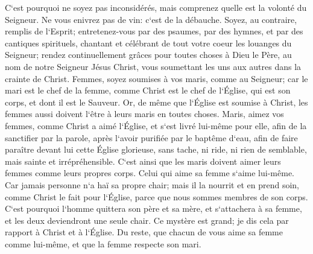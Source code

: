 \verse C`est pourquoi ne soyez pas inconsidérés, mais comprenez quelle est la volonté du Seigneur. 
\verse Ne vous enivrez pas de vin: c`est de la débauche. Soyez, au contraire, remplis de l`Esprit; 
\verse entretenez-vous par des psaumes, par des hymnes, et par des cantiques spirituels, chantant et célébrant de tout votre coeur les louanges du Seigneur; 
\verse rendez continuellement grâces pour toutes choses à Dieu le Père, au nom de notre Seigneur Jésus Christ, 
\verse vous soumettant les uns aux autres dans la crainte de Christ. 
\verse Femmes, soyez soumises à vos maris, comme au Seigneur; 
\verse car le mari est le chef de la femme, comme Christ est le chef de l`Église, qui est son corps, et dont il est le Sauveur. 
\verse Or, de même que l`Église est soumise à Christ, les femmes aussi doivent l`être à leurs maris en toutes choses. 
\verse Maris, aimez vos femmes, comme Christ a aimé l`Église, et s`est livré lui-même pour elle, 
\verse afin de la sanctifier par la parole, après l`avoir purifiée par le baptême d`eau, 
\verse afin de faire paraître devant lui cette Église glorieuse, sans tache, ni ride, ni rien de semblable, mais sainte et irrépréhensible. 
\verse C`est ainsi que les maris doivent aimer leurs femmes comme leurs propres corps. Celui qui aime sa femme s`aime lui-même. 
\verse Car jamais personne n`a haï sa propre chair; mais il la nourrit et en prend soin, comme Christ le fait pour l`Église, 
\verse parce que nous sommes membres de son corps. 
\verse C`est pourquoi l`homme quittera son père et sa mère, et s`attachera à sa femme, et les deux deviendront une seule chair. 
\verse Ce mystère est grand; je dis cela par rapport à Christ et à l`Église. 
\verse Du reste, que chacun de vous aime sa femme comme lui-même, et que la femme respecte son mari. 

